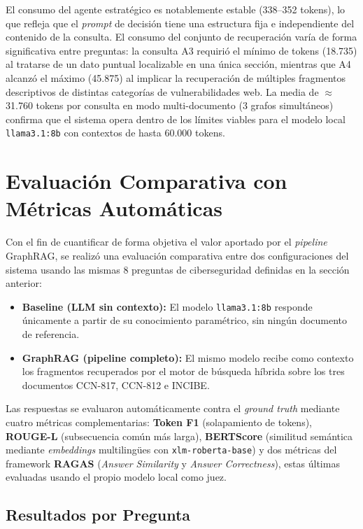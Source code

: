 El consumo del agente estratégico es notablemente estable (338–352 tokens), lo que refleja que el \textit{prompt} de decisión tiene una estructura fija e independiente del contenido de la consulta. El consumo del conjunto de recuperación varía de forma significativa entre preguntas: la consulta A3 requirió el mínimo de tokens (18.735) al tratarse de un dato puntual localizable en una única sección, mientras que A4 alcanzó el máximo (45.875) al implicar la recuperación de múltiples fragmentos descriptivos de distintas categorías de vulnerabilidades web. La media de $\approx$31.760 tokens por consulta en modo multi-documento (3 grafos simultáneos) confirma que el sistema opera dentro de los límites viables para el modelo local \texttt{llama3.1:8b} con contextos de hasta 60.000 tokens.

\newpage
\section{Evaluación Comparativa con Métricas Automáticas}\label{sec:metricas_auto}

Con el fin de cuantificar de forma objetiva el valor aportado por el \textit{pipeline} GraphRAG, se realizó una evaluación comparativa entre dos configuraciones del sistema usando las mismas 8 preguntas de ciberseguridad definidas en la sección anterior:

\begin{itemize}
    \item \textbf{Baseline (LLM sin contexto):} El modelo \texttt{llama3.1:8b} responde únicamente a partir de su conocimiento paramétrico, sin ningún documento de referencia.
    \item \textbf{GraphRAG (pipeline completo):} El mismo modelo recibe como contexto los fragmentos recuperados por el motor de búsqueda híbrida sobre los tres documentos CCN-817, CCN-812 e INCIBE.
\end{itemize}

Las respuestas se evaluaron automáticamente contra el \textit{ground truth} mediante cuatro métricas complementarias: \textbf{Token F1} (solapamiento de tokens), \textbf{ROUGE-L} (subsecuencia común más larga), \textbf{BERTScore} (similitud semántica mediante \textit{embeddings} multilingües con \texttt{xlm-roberta-base}) y dos métricas del framework \textbf{RAGAS} (\textit{Answer Similarity} y \textit{Answer Correctness}), estas últimas evaluadas usando el propio modelo local como juez.

\subsection{Resultados por Pregunta}

